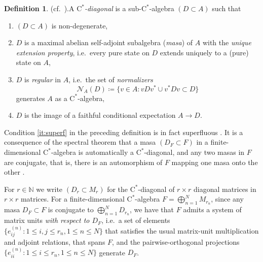 \documentclass[11pt,a4paper]{amsart}
\theoremstyle{definition}
\newtheorem{definition}[theorem]{Definition}
\numberwithin{equation}{section}
\newcommand{\mc}[1]{\mathcal{#1}}
\newcommand{\bb}[1]{\mathbb{#1}}
\begin{document}
\begin{definition}{(cf.\ \cite{Kum86}).}\label{def:diag}
A \emph{$\mathrm{C}^\ast$-diagonal} is a sub-$\mathrm{C}^\ast$-algebra $(D\subset A)$ such that
\begin{enumerate}[label=(\roman*)]
\item\label{it:superf} $(D\subset A)$ is non-degenerate,
\item  $D$ is a maximal abelian self-adjoint subalgebra (\emph{masa}) of $A$ with the \emph{unique extension property}, i.e.\ every pure state on $D$ extends uniquely to a (pure) state on $A$,
\item $D$ is \emph{regular} in $A$, i.e.\ the set of \emph{normalizers} 
\[
\mc{N}_A(D)\coloneqq \{v\in A: vDv^*\cup v^*Dv\subset D\}
\] 
generates $A$ as a $\mathrm{C}^\ast$-algebra,
\item $D$ is the image of a faithful conditional expectation $A\to D$.
\end{enumerate}
\end{definition}
Condition \ref{it:superf} in the preceding definition is in fact superfluous \cite{Pit21}. It is a consequence of the spectral theorem that a masa $(D_F\subset F)$ in a finite-dimensional $\mathrm{C}^\ast$-algebra is automatically a $\mathrm{C}^\ast$-diagonal, and any two masas in $F$ are conjugate, that is, there is an automorphism of $F$ mapping one masa onto the other \cite[Example~1.5]{LiLiaWin23}.

For $r\in\bb{N}$ we write $(D_r\subset M_r)$ for the $\mathrm{C}^\ast$-diagonal of $r\times r$ diagonal matrices in $r\times r$ matrices. For a finite-dimensional $\mathrm{C}^\ast$-algebra $F=\bigoplus_{n=1}^NM_{r_n}$, since any masa $D_F\subset F$ is conjugate to $\bigoplus_{n=1}^ND_{r_n}$, we have that $F$ admits a system of matrix units \emph{with respect to $D_F$}, i.e.\ a set of elements $\{e_{ij}^{(n)}:1\le i,j\le r_n, 1\le n\le N\}$ that satisfies the usual matrix-unit multiplication and adjoint relations, that spans $F$, and the pairwise-orthogonal projections $\{e_{ii}^{(n)}: 1\le i\le r_n, 1\le n\le N\}$ generate $D_F$.
\end{document}
